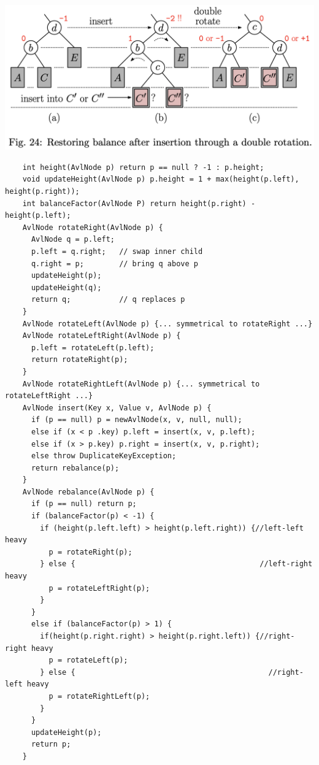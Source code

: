 \documentclass{article}
\begin{document}
  \begin{center}
  \includegraphics[scale=0.4]{AVLDoubleRotationInsertion}
  \end{center}
  \newpage
  \begin{lstlisting}
    int height(AvlNode p) return p == null ? -1 : p.height;
    void updateHeight(AvlNode p) p.height = 1 + max(height(p.left), height(p.right));
    int balanceFactor(AvlNode P) return height(p.right) - height(p.left);
    AvlNode rotateRight(AvlNode p) {
      AvlNode q = p.left;
      p.left = q.right;   // swap inner child
      q.right = p;        // bring q above p
      updateHeight(p);
      updateHeight(q);
      return q;           // q replaces p
    }
    AvlNode rotateLeft(AvlNode p) {... symmetrical to rotateRight ...}
    AvlNode rotateLeftRight(AvlNode p) {
      p.left = rotateLeft(p.left);
      return rotateRight(p);
    }
    AvlNode rotateRightLeft(AvlNode p) {... symmetrical to rotateLeftRight ...}
    AvlNode insert(Key x, Value v, AvlNode p) {
      if (p == null) p = newAvlNode(x, v, null, null);
      else if (x < p .key) p.left = insert(x, v, p.left);
      else if (x > p.key) p.right = insert(x, v, p.right);
      else throw DuplicateKeyException;
      return rebalance(p);
    }
    AvlNode rebalance(AvlNode p) {
      if (p == null) return p;
      if (balanceFactor(p) < -1) {
        if (height(p.left.left) > height(p.left.right)) {//left-left heavy
          p = rotateRight(p);
        } else {                                          //left-right heavy
          p = rotateLeftRight(p);
        }
      }
      else if (balanceFactor(p) > 1) {
        if(height(p.right.right) > height(p.right.left)) {//right-right heavy
          p = rotateLeft(p);
        } else {                                            //right-left heavy
          p = rotateRightLeft(p);
        }
      }
      updateHeight(p);
      return p;
    }
  \end{lstlisting}
  \newpage
\end{document}

